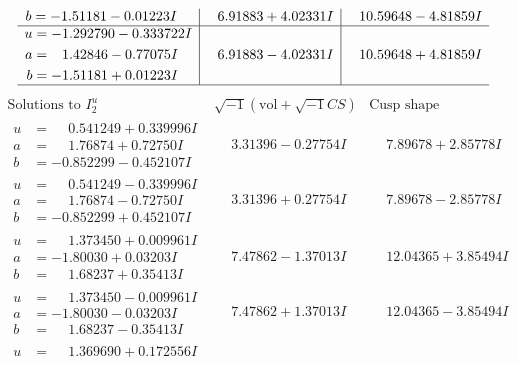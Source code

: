 \documentclass[1p]{elsarticle_modified}
\theoremstyle{definition}
\newcommand{\I}{\sqrt{-1}}
\begin{document}
$$\begin{array}{c|c|c}
\begin{aligned}
b &= -1.51181 - 0.01223 I\end{aligned}
 & \phantom{-}6.91883 + 4.02331 I & \phantom{-}10.59648 - 4.81859 I \\ \hline\begin{aligned}
u &= -1.292790 - 0.333722 I \\
a &= \phantom{-}1.42846 - 0.77075 I \\
b &= -1.51181 + 0.01223 I\end{aligned}
 & \phantom{-}6.91883 - 4.02331 I & \phantom{-}10.59648 + 4.81859 I\\
 \hline 
 \end{array}$$\newpage$$\begin{array}{c|c|c}  
\text{Solutions to }I^u_{2}& \I (\text{vol} + \sqrt{-1}CS) & \text{Cusp shape}\\
 \hline 
\begin{aligned}
u &= \phantom{-}0.541249 + 0.339996 I \\
a &= \phantom{-}1.76874 + 0.72750 I \\
b &= -0.852299 - 0.452107 I\end{aligned}
 & \phantom{-}3.31396 - 0.27754 I & \phantom{-}7.89678 + 2.85778 I \\ \hline\begin{aligned}
u &= \phantom{-}0.541249 - 0.339996 I \\
a &= \phantom{-}1.76874 - 0.72750 I \\
b &= -0.852299 + 0.452107 I\end{aligned}
 & \phantom{-}3.31396 + 0.27754 I & \phantom{-}7.89678 - 2.85778 I \\ \hline\begin{aligned}
u &= \phantom{-}1.373450 + 0.009961 I \\
a &= -1.80030 + 0.03203 I \\
b &= \phantom{-}1.68237 + 0.35413 I\end{aligned}
 & \phantom{-}7.47862 - 1.37013 I & \phantom{-}12.04365 + 3.85494 I \\ \hline\begin{aligned}
u &= \phantom{-}1.373450 - 0.009961 I \\
a &= -1.80030 - 0.03203 I \\
b &= \phantom{-}1.68237 - 0.35413 I\end{aligned}
 & \phantom{-}7.47862 + 1.37013 I & \phantom{-}12.04365 - 3.85494 I \\ \hline\begin{aligned}
u &= \phantom{-}1.369690 + 0.172556 I \\

\end{aligned}
\end{array}$$
\end{document}
